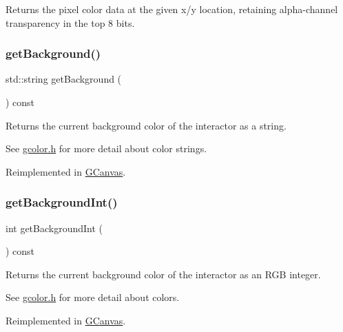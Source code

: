 Returns the pixel color data at the given x/y location, retaining alpha-\/channel transparency in the top 8 bits. 

\mbox{\label{classGDrawingSurface_a808e22cc1fdfbecf71ed8c64ef4600e0}} 
\subsubsection{\texorpdfstring{get\+Background()}{getBackground()}}
{\footnotesize\ttfamily std\+::string get\+Background (\begin{DoxyParamCaption}{ }\end{DoxyParamCaption}) const\hspace{0.3cm}{\ttfamily [virtual]}}



Returns the current background color of the interactor as a string. 

See \mbox{\hyperlink{gcolor_8h_source}{gcolor.\+h}} for more detail about color strings. 

Reimplemented in \mbox{\hyperlink{classGCanvas_ab44f928b6bd7c8e4b82d5ed92bc3d4c6}{G\+Canvas}}.

\mbox{\label{classGDrawingSurface_a9e827257a55cb8cf4d9de2ec6bcfd7a0}} 
\subsubsection{\texorpdfstring{get\+Background\+Int()}{getBackgroundInt()}}
{\footnotesize\ttfamily int get\+Background\+Int (\begin{DoxyParamCaption}{ }\end{DoxyParamCaption}) const\hspace{0.3cm}{\ttfamily [virtual]}}



Returns the current background color of the interactor as an R\+GB integer. 

See \mbox{\hyperlink{gcolor_8h_source}{gcolor.\+h}} for more detail about colors. 

Reimplemented in \mbox{\hyperlink{classGCanvas_af66f525e8154dbc8dcd2daecf3728ba9}{G\+Canvas}}.

